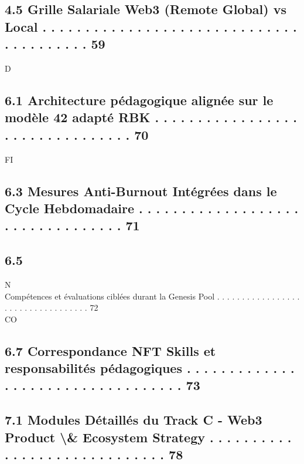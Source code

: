\documentclass[12pt,landscape,a4paper]{article}
\begin{document}
\subsection{4.5 Grille Salariale Web3 (Remote Global) vs Local . . . . . . . . . . . . . . . . . . . . . . . . . . . . . . . . . . . . . . . .      59}
\vspace{0.5em}
\vspace{0.5em}
\vspace{0.5em}
\vspace{0.5em}
D\\
\subsection{6.1   Architecture pédagogique alignée sur le modèle 42 adapté RBK . . . . . . . . . . . . . . . . . . . . . . . . . . . . . . . .      70}
\vspace{0.5em}
\vspace{0.5em}
\vspace{0.5em}
\vspace{0.5em}
FI\\
\subsection{6.3   Mesures Anti-Burnout Intégrées dans le Cycle Hebdomadaire . . . . . . . . . . . . . . . . . . . . . . . . . . . . . . . . .       71}
\subsection{6.5}
N\\
Compétences et évaluations ciblées durant la Genesis Pool . . . . . . . . . . . . . . . . . . . . . . . . . . . . . . . . . .     72\\
CO\\
\subsection{6.7   Correspondance NFT Skills et responsabilités pédagogiques . . . . . . . . . . . . . . . . . . . . . . . . . . . . . . . . . .     73}
\vspace{0.5em}
\subsection{7.1 Modules Détaillés du Track C - Web3 Product \textbackslash{}& Ecosystem Strategy . . . . . . . . . . . . . . . . . . . . . . . . . . . . .          78}
\end{document}
